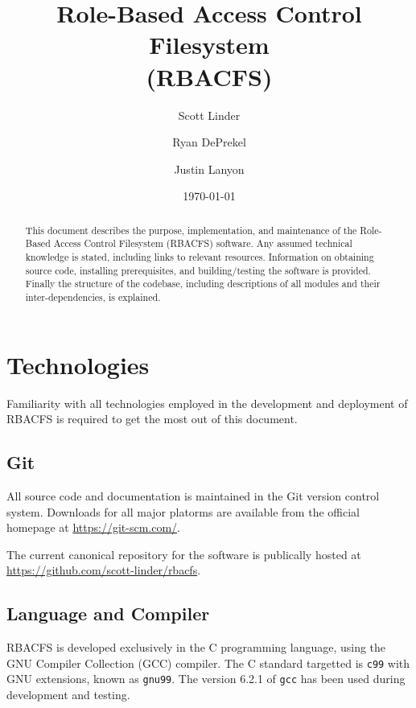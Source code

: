 \documentclass[11pt,oneside,letterpaper]{article}
\begin{document}
\title{
    Role-Based Access Control Filesystem\\
    (RBACFS)
}
\author{
    Scott Linder\\
    \and
    Ryan DePrekel\\
    \and
    Justin Lanyon
}
\date{\today}

\maketitle

\begin{abstract}
This document describes the purpose, implementation, and maintenance of the
Role-Based Access Control Filesystem (RBACFS) software. Any assumed technical
knowledge is stated, including links to relevant resources. Information on
obtaining source code, installing prerequisites, and building/testing the
software is provided. Finally the structure of the codebase, including
descriptions of all modules and their inter-dependencies, is explained.
\end{abstract}

\section{Technologies}

Familiarity with all technologies employed in the development and deployment of
RBACFS is required to get the most out of this document.

\subsection{Git}

All source code and documentation is maintained in the Git version control
system. Downloads for all major platorms are available from the official
homepage at \url{https://git-scm.com/}.

The current canonical repository for the software is publically hosted at
\url{https://github.com/scott-linder/rbacfs}.

\subsection{Language and Compiler}

RBACFS is developed exclusively in the C programming language, using the GNU
Compiler Collection (GCC) compiler. The C standard targetted is {\tt c99} with
GNU extensions, known as {\tt gnu99}. The version 6.2.1 of {\tt gcc} has been
used during development and testing.
\end{document}
